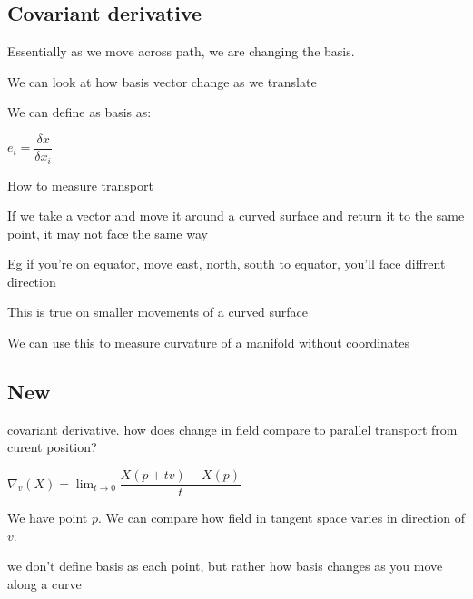 
\subsection{Covariant derivative}

Essentially as we move across path, we are changing the basis.

We can look at how basis vector change as we translate

We can define as basis as:

\(e_i=\dfrac{\delta x}{\delta x_i}\)

How to measure transport

If we take a vector and move it around a curved surface and return it to the same point, it may not face the same way

Eg if you're on equator, move east, north, south to equator, you'll face diffrent direction

This is true on smaller movements of a curved surface

We can use this to measure curvature of a manifold without coordinates 

\subsection{New}

covariant derivative. how does change in field compare to parallel transport from curent position?

\(\nabla_v (X)=\lim_{t\rightarrow 0}\dfrac{X(p+tv)-X(p)}{t}\)

We have point \(p\). We can compare how field in tangent space varies in direction of \(v\).

we don't define basis as each point, but rather how basis changes as you move along a curve


